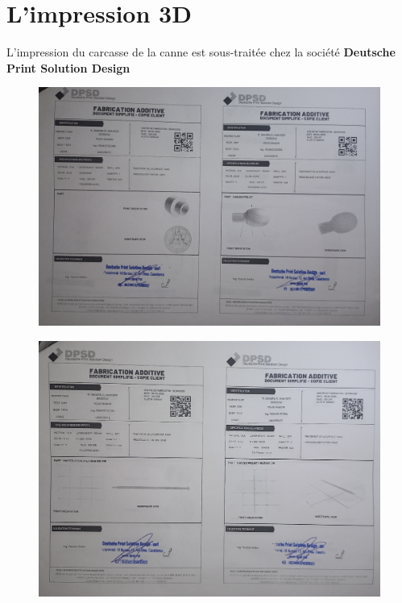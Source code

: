 \FloatBarrier

\section{L'impression 3D}
L'impression du carcasse de la canne est sous-traitée chez la société \textbf{Deutsche Print Solution Design}

\begin{figure}[!htbp]
    \centering
    \includegraphics[height=.4\textheight]{assets/realisation/dpsd/1.jpg}
\end{figure}

\begin{figure}[!htbp]
    \centering
    \includegraphics[height=.4\textheight]{assets/realisation/dpsd/2.jpg}
\end{figure}

